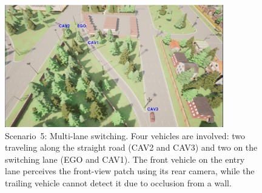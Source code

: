 \begin{figure}[H]
    \centering
    \includegraphics[width=0.85\textwidth]{figures/experiments/scenario5_v1.png}
    \caption{Scenario~5: Multi-lane switching. Four vehicles are involved: 
    two traveling along the straight road (CAV2 and CAV3) and two on the switching lane (EGO and CAV1). 
    The front vehicle on the entry lane perceives the front-view patch 
    using its rear camera, while the trailing vehicle cannot detect it 
    due to occlusion from a wall.}
    \label{fig:scenario5_multilane}
\end{figure}

